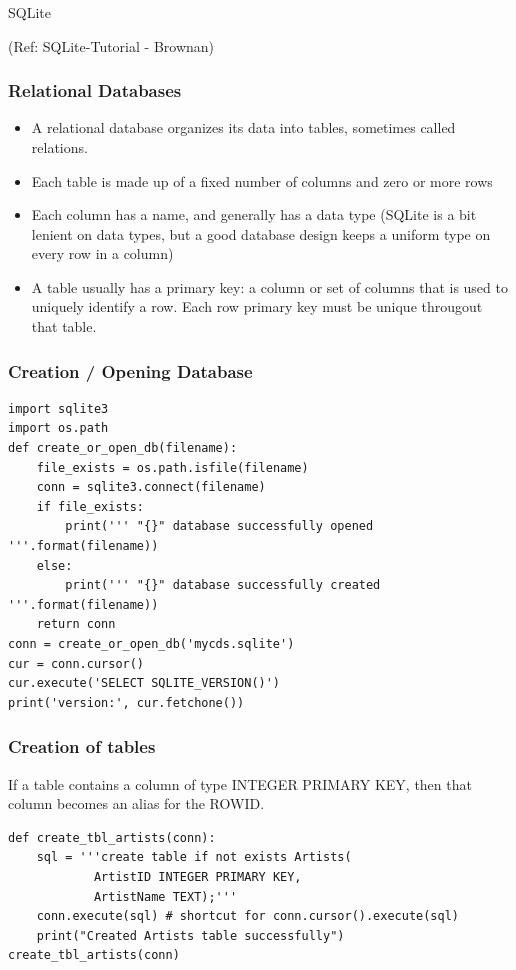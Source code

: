 \begin{frame}[fragile]\frametitle{}
\begin{center}
{\Large SQLite}

(Ref: SQLite-Tutorial - Brownan)
\end{center}
\end{frame}

\begin{frame}[fragile] \frametitle{Relational Databases}
\begin{itemize}
\item A relational database organizes its data into tables, sometimes called relations.
\item Each table is made up of a fixed number of columns and zero or more rows
\item Each column has a name, and generally has a data type (SQLite is a bit lenient on data types, but a good database design keeps a uniform type on every row in a column)
\item A table usually has a primary key: a column or set of columns that is used to uniquely identify a row. Each row primary key must be unique througout that table.
\end{itemize}
\end{frame}

\begin{frame}[fragile] \frametitle{Creation / Opening Database}
\begin{lstlisting}
import sqlite3
import os.path
def create_or_open_db(filename):
    file_exists = os.path.isfile(filename)
    conn = sqlite3.connect(filename)
    if file_exists:
        print(''' "{}" database successfully opened '''.format(filename))
    else:
        print(''' "{}" database successfully created '''.format(filename))
    return conn
conn = create_or_open_db('mycds.sqlite')
cur = conn.cursor()
cur.execute('SELECT SQLITE_VERSION()')
print('version:', cur.fetchone())
\end{lstlisting}

\end{frame}

\begin{frame}[fragile] \frametitle{Creation of tables}
If a table contains a column of type INTEGER PRIMARY KEY, then that column becomes an alias for the ROWID.
\begin{lstlisting}
def create_tbl_artists(conn):
    sql = '''create table if not exists Artists(
            ArtistID INTEGER PRIMARY KEY,
            ArtistName TEXT);'''
    conn.execute(sql) # shortcut for conn.cursor().execute(sql)
    print("Created Artists table successfully")
create_tbl_artists(conn)
\end{lstlisting}

\end{frame}


